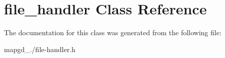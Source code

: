 \hypertarget{classfile__handler}{\section{file\-\_\-handler Class Reference}
\label{classfile__handler}
}


The documentation for this class was generated from the following file\-:\begin{DoxyCompactItemize}
\item 
mapgd\-\_./file-\/handler.\-h\end{DoxyCompactItemize}
